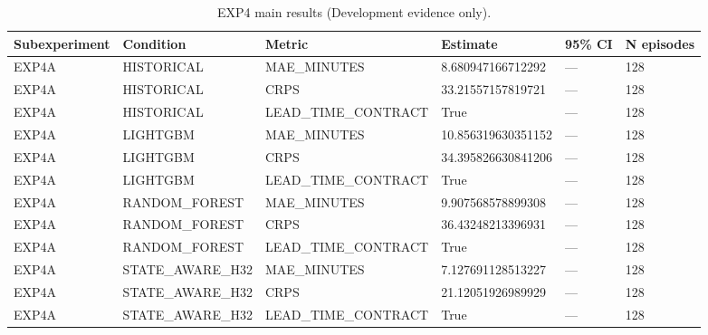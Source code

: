 \begin{table}[ht]
\caption{EXP4 main results (Development evidence only).}
\centering
\begin{tabular}{llllll}
\toprule
Subexperiment & Condition & Metric & Estimate & 95\% CI & N episodes \\
\midrule
EXP4A & HISTORICAL & MAE\_MINUTES & 8.680947166712292 & — & 128 \\
EXP4A & HISTORICAL & CRPS & 33.21557157819721 & — & 128 \\
EXP4A & HISTORICAL & LEAD\_TIME\_CONTRACT & True & — & 128 \\
EXP4A & LIGHTGBM & MAE\_MINUTES & 10.856319630351152 & — & 128 \\
EXP4A & LIGHTGBM & CRPS & 34.395826630841206 & — & 128 \\
EXP4A & LIGHTGBM & LEAD\_TIME\_CONTRACT & True & — & 128 \\
EXP4A & RANDOM\_FOREST & MAE\_MINUTES & 9.907568578899308 & — & 128 \\
EXP4A & RANDOM\_FOREST & CRPS & 36.43248213396931 & — & 128 \\
EXP4A & RANDOM\_FOREST & LEAD\_TIME\_CONTRACT & True & — & 128 \\
EXP4A & STATE\_AWARE\_H32 & MAE\_MINUTES & 7.127691128513227 & — & 128 \\
EXP4A & STATE\_AWARE\_H32 & CRPS & 21.12051926989929 & — & 128 \\
EXP4A & STATE\_AWARE\_H32 & LEAD\_TIME\_CONTRACT & True & — & 128 \\
\bottomrule
\end{tabular}
\end{table}

